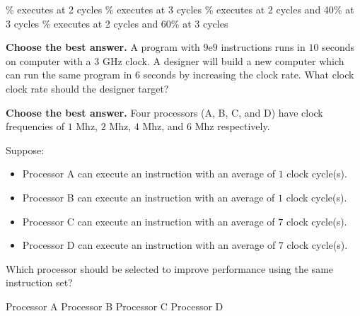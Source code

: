 \documentclass{exam}
\begin{document}
\begin{questions}
		\begin{choices}
			\% executes at 2 cycles
			\% executes at 3 cycles
			\% executes at 2 cycles and 40\% at 3 cycles
			\% executes at 2 cycles and 60\% at 3 cycles
		\end{choices}%

\question \textbf{Choose the best answer.}
           A program with $9\mathrm{e}{9}$ instructions runs in $10$ seconds on computer with a $3$ GHz clock. 
           A designer will build a new computer which can run the same program in $6$ seconds by increasing the clock rate. 
           What clock clock rate should the designer target? 
           
		\begin{choices}
			\choice 0.5
			\choice 1.5
			\CorrectChoice 5.0
			\choice 0.15
			\choice 50.0
			\choice 15.0
		\end{choices}%

\question \textbf{Choose the best answer.}
        Four processors (A, B, C, and D) have clock frequencies of $1$ Mhz, $2$ Mhz, $4$ Mhz, and $6$ Mhz respectively.
        
        Suppose:
        \begin{itemize}
            \item[] Processor A can execute an instruction with an average of $1$ clock cycle(s).
            \item[] Processor B can execute an instruction with an average of $1$ clock cycle(s).
            \item[] Processor C can execute an instruction with an average of $7$ clock cycle(s).
            \item[] Processor D can execute an instruction with an average of $7$ clock cycle(s).
        \end{itemize}
        
        Which processor should be selected to improve performance using the same instruction set? 
        
		\begin{choices}
			\choice Processor A
			\CorrectChoice Processor B
			\choice Processor C
			\choice Processor D
		\end{choices}%



\end{questions}
\end{document}
